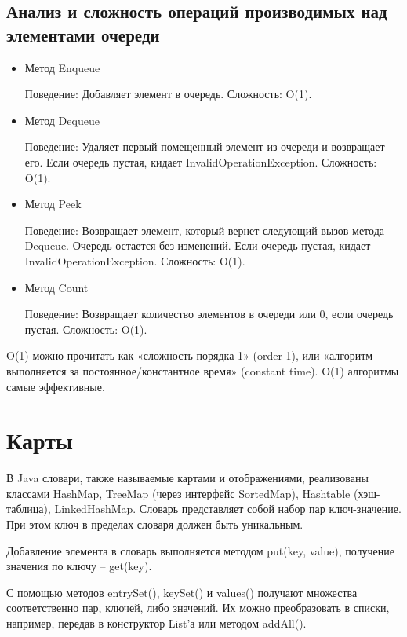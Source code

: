 \section{Анализ и сложность операций производимых над элементами очереди}


\begin{itemize}
\item Метод Enqueue

Поведение: Добавляет элемент в очередь.
Сложность: O(1).
\item Метод Dequeue

Поведение: Удаляет первый помещенный элемент из очереди и возвращает его. Если очередь пустая, кидает InvalidOperationException.
Сложность: O(1).
\item Метод Peek

Поведение: Возвращает элемент, который вернет следующий вызов метода Dequeue. Очередь остается без изменений. Если очередь пустая, кидает InvalidOperationException.
Сложность: O(1).
\item Метод Count

Поведение: Возвращает количество элементов в очереди или 0, если очередь пустая.
Сложность: O(1).
\end{itemize}

O(1) можно прочитать как «сложность порядка 1» (order 1), или «алгоритм выполняется за постоянное/константное время» (constant time). O(1) алгоритмы самые эффективные.

\chapter{Карты}

В Java словари, также называемые картами и отображениями, реализованы классами HashMap, TreeMap (через интерфейс SortedMap), Hashtable (хэш-таблица), LinkedHashMap. Словарь представляет собой набор пар ключ-значение. При этом ключ в пределах словаря должен быть уникальным.

Добавление элемента в словарь выполняется методом put(key, value), получение значения по ключу – get(key).

С помощью методов entrySet(), keySet() и values() получают множества соответственно пар, ключей, либо значений. Их можно преобразовать в списки, например, передав в конструктор List'а или методом addAll().

